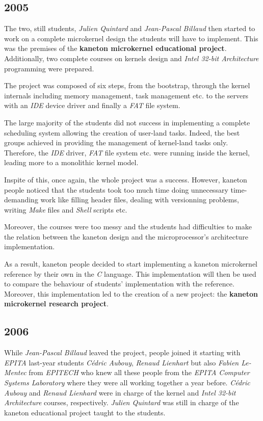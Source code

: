\begin{multicols}{2}
%
%

\subsection{2005}

The two, still students, \textit{Julien Quintard} and \textit{Jean-Pascal
Billaud} then started to work on a complete microkernel design the students
will have to implement. This was the premises of the \textbf{kaneton
microkernel educational project}. Additionally, two complete courses on kernels
design and \textit{Intel 32-bit Architecture} programming were prepared.

The project was composed of six steps, from the bootstrap, through the
kernel internals including memory management, task management etc.
to the servers with an \textit{IDE} device driver and finally a \textit{FAT}
file system.

The large majority of the students did not success in implementing a
complete scheduling system allowing the creation of user-land tasks. Indeed,
the best groups achieved in providing the management of kernel-land tasks only.
Therefore, the \textit{IDE} driver, \textit{FAT} file system etc. were
running inside the kernel, leading more to a monolithic kernel model.

Inspite of this, once again, the whole project was a success. However,
kaneton people noticed that the students took too much time doing unnecessary
time-demanding work like filling header files, dealing with versionning
problems, writing \textit{Make} files and \textit{Shell} scripts etc.

Moreover, the courses were too messy and the students had difficulties
to make the relation between the kaneton design and the microprocessor's
architecture implementation.

As a result, kaneton people decided to start implementing a kaneton microkernel
reference by their own in the \textit{C} language. This implementation will
then be used to compare the behaviour of students' implementation with
the reference. Moreover, this implementation led to the creation of a
new project: the \textbf{kaneton microkernel research project}.

%
%

\subsection{2006}

While \textit{Jean-Pascal Billaud} leaved the project, people joined it
starting with \textit{EPITA} last-year students \textit{C\'edric Aubouy},
\textit{Renaud Lienhart} but also \textit{Fabien Le-Mentec} from
\textit{EPITECH} who knew all these people from the \textit{EPITA Computer
Systems Laboratory} where they were all working together a year before.
\textit{C\'edric Aubouy} and \textit{Renaud Lienhard} were in charge of the
kernel and \textit{Intel 32-bit Architecture} courses, respectively.
\textit{Julien Quintard} was still in charge of the kaneton educational
project taught to the students.


\end{multicols}
